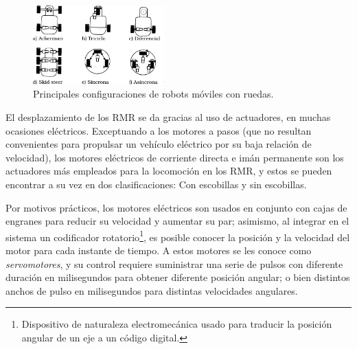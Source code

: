 \begin{figure}[htbp!]
	\centering
	\includegraphics[width=0.45\textwidth]{./Figuras/Configuraciones}
	\caption{Principales configuraciones de robots móviles con ruedas.}
	\label{fig:configuraciones}
\end{figure}
\par El desplazamiento de los RMR se da gracias al uso de actuadores, en muchas ocasiones eléctricos. Exceptuando a los motores a pasos (que no resultan convenientes para propulsar un vehículo eléctrico por su baja relación de velocidad), los motores eléctricos de corriente directa e imán permanente son los actuadores más empleados para la locomoción en los RMR, y estos se pueden encontrar a su vez en dos clasificaciones: Con escobillas y sin escobillas.
\par Por motivos prácticos, los motores eléctricos son usados en conjunto con cajas de engranes para reducir su velocidad y aumentar su par; asimismo, al integrar en el sistema un codificador rotatorio\footnote{Dispositivo de naturaleza electromecánica usado para traducir la posición angular de un eje a un código digital.}, es posible conocer la posición y la velocidad del motor para cada instante de tiempo. A estos motores se les conoce como {\it servomotores}, y su control requiere suministrar una serie de pulsos con diferente duración en milisegundos para obtener diferente posición angular; o bien distintos anchos de pulso en milisegundos para distintas velocidades angulares.
